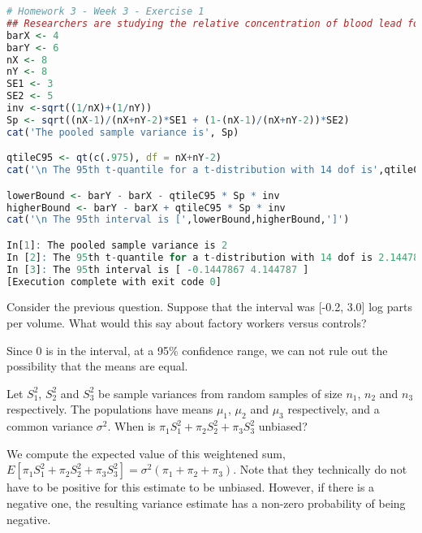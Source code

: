 \documentclass{homework}
\begin{document}
\begin{lstlisting}[language=R]
# Homework 3 - Week 3 - Exercise 1
## Researchers are studying the relative concentration of blood lead for factory workers. They took the natural logarithm of ratio of blood lead concentration for 8 factory workers and 8 control subjects. The measurements resulted in a mean log concentration of 6 (log parts per volume) for the factory workers and 4 for the control subjects. The sample variance in the factory workers was 3 while it was 5 in the control group. Assuming equal variances, create a 95\% confidence interval for the difference in the population means of log blood lead concentration between factory workers and controls (Factory works - Controls).
barX <- 4
barY <- 6
nX <- 8
nY <- 8
SE1 <- 3
SE2 <- 5
inv <-sqrt((1/nX)+(1/nY))
Sp <- sqrt((nX-1)/(nX+nY-2)*SE1 + (1-(nX-1)/(nX+nY-2))*SE2)
cat('The pooled sample variance is', Sp)

qtileC95 <- qt(c(.975), df = nX+nY-2)
cat('\n The 95th t-quantile for a t-distribution with 14 dof is',qtileC95)

lowerBound <- barY - barX - qtileC95 * Sp * inv
higherBound <- barY - barX + qtileC95 * Sp * inv
cat('\n The 95th interval is [',lowerBound,higherBound,']')

In[1]: The pooled sample variance is 2
In [2]: The 95th t-quantile for a t-distribution with 14 dof is 2.144787
In [3]: The 95th interval is [ -0.1447867 4.144787 ]
[Execution complete with exit code 0]
\end{lstlisting}

\begin{tcolorbox}[title=Question 2]
Consider the previous question. Suppose that the interval was [-0.2, 3.0] log parts per volume. What would this say about factory workers versus controls?
\end{tcolorbox}

Since 0 is in the interval, at a 95\% confidence range, we can not rule out the possibility that the means are equal.

\begin{tcolorbox}[title=Question 3]
Let $S_1^2$, $S_2^2$ and $S_3^2$ be sample variances from random samples of size $n_1$, $n_2$ and $n_3$ respectively. The populations have means $\mu_1$, $\mu_2$ and $\mu_3$ respectively, and a common variance $\sigma^2$. When is $\pi_1 S_1^2  + \pi_2 S_2^2 + \pi_3 S_3^2$ unbiased?
\end{tcolorbox}

We compute the expected value of this weightened sum, $E[\pi_1 S_1^2  + \pi_2 S_2^2 + \pi_3 S_3^2]=\sigma^2(\pi_1+ \pi_2 + \pi_3).$ Note that they technically do not have to be positive for this estimate to be unbiased. However, if there is a negative one, the resulting variance estimate has a non-zero probability of being negative.\\
\end{document}
